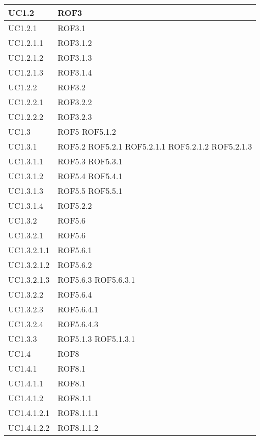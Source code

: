 \begin{center}
\begin{longtable}{| p{4cm} | p{4cm} |}
\hline
UC1.2 & ROF3 \\
\hline
UC1.2.1 & ROF3.1 \\
\hline
UC1.2.1.1 & ROF3.1.2 \\
\hline
UC1.2.1.2 & ROF3.1.3 \\
\hline
UC1.2.1.3 & ROF3.1.4 \\
\hline
UC1.2.2 & ROF3.2 \\
\hline
UC1.2.2.1 & ROF3.2.2 \\
\hline
UC1.2.2.2 & ROF3.2.3 \\
\hline
UC1.3 & ROF5 \newline ROF5.1.2 \\
\hline
UC1.3.1 & ROF5.2 \newline ROF5.2.1 \newline ROF5.2.1.1 \newline ROF5.2.1.2 \newline ROF5.2.1.3 \\
\hline
UC1.3.1.1 & ROF5.3 \newline ROF5.3.1 \\
\hline
UC1.3.1.2 & ROF5.4 \newline ROF5.4.1 \\
\hline
UC1.3.1.3 & ROF5.5 \newline ROF5.5.1 \\
\hline
UC1.3.1.4 & ROF5.2.2 \\
\hline
UC1.3.2 & ROF5.6 \\
\hline
UC1.3.2.1 & ROF5.6 \\
\hline
UC1.3.2.1.1 & ROF5.6.1 \\
\hline
UC1.3.2.1.2 & ROF5.6.2 \\
\hline
UC1.3.2.1.3 & ROF5.6.3 \newline ROF5.6.3.1 \\
\hline
UC1.3.2.2 & ROF5.6.4 \\
\hline
UC1.3.2.3 & ROF5.6.4.1 \\
\hline
UC1.3.2.4 & ROF5.6.4.3 \\
\hline
UC1.3.3 & ROF5.1.3 \newline ROF5.1.3.1 \\
\hline
UC1.4 & ROF8 \\
\hline
UC1.4.1 & ROF8.1 \\
\hline
UC1.4.1.1 & ROF8.1 \\
\hline
UC1.4.1.2 & ROF8.1.1 \\
\hline
UC1.4.1.2.1 & ROF8.1.1.1 \\
\hline
UC1.4.1.2.2 & ROF8.1.1.2 \\

\end{longtable}
\end{center}
